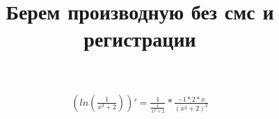 \documentclass{article}
\title{Берем производную без смс и регистрации}
\begin{document}
\maketitle
\begin{eqnarray}
\left( ln\left(\frac{{1}}{{{{x}}^{{2}}+{2}}}\right)\right) ' = 
{\frac{{1}}{\frac{{1}}{{{{x}}^{{2}}+{2}}}}*\frac{{{-1}*{{2}*{x}}}}{{\left({{{x}}^{{2}}+{2}}\right)}^{{2}}}}\end{eqnarray}
\end{document}
